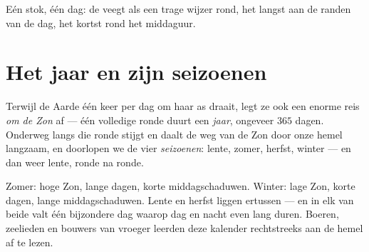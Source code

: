 \begin{omfigure}

{\small Eén stok, één dag: de  veegt als een trage wijzer rond,
het langst aan de randen van de dag, het kortst rond het middaguur.}
\end{omfigure}

\section{Het jaar en zijn seizoenen}

\begin{definition}\label{def:g3:sun-days-seasons:year}
Terwijl de Aarde één keer per dag om haar as draait, legt ze ook een
enorme reis \emph{om de Zon} af --- één volledige ronde duurt een
\emph{jaar}, ongeveer $365$ dagen. Onderweg langs die
ronde stijgt en daalt de weg van de Zon door onze hemel langzaam, en
doorlopen we de vier \emph{seizoenen}: lente, zomer,
herfst, winter --- en dan weer lente, ronde na ronde.
\end{definition}

\begin{example}\label{ex:g3:sun-days-seasons:quarters}
Zomer: hoge Zon, lange dagen, korte middagschaduwen. Winter: lage Zon,
korte dagen, lange middagschaduwen. Lente en herfst liggen ertussen ---
en in elk van beide valt één bijzondere dag waarop dag en nacht even
lang duren. Boeren, zeelieden en bouwers van vroeger leerden deze
kalender rechtstreeks aan de hemel af te lezen.
\end{example}

